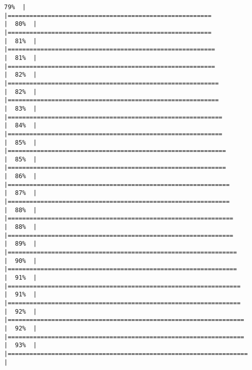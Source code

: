 \documentclass[
]{article}
\begin{document}
\begin{verbatim}
79%  |                                                                              |========================================================              |  80%  |                                                                              |========================================================              |  81%  |                                                                              |=========================================================             |  81%  |                                                                              |=========================================================             |  82%  |                                                                              |==========================================================            |  82%  |                                                                              |==========================================================            |  83%  |                                                                              |===========================================================           |  84%  |                                                                              |===========================================================           |  85%  |                                                                              |============================================================          |  85%  |                                                                              |============================================================          |  86%  |                                                                              |=============================================================         |  87%  |                                                                              |=============================================================         |  88%  |                                                                              |==============================================================        |  88%  |                                                                              |==============================================================        |  89%  |                                                                              |===============================================================       |  90%  |                                                                              |===============================================================       |  91%  |                                                                              |================================================================      |  91%  |                                                                              |================================================================      |  92%  |                                                                              |=================================================================     |  92%  |                                                                              |=================================================================     |  93%  |                                                                              |==================================================================    |  
\end{verbatim}
\end{document}
